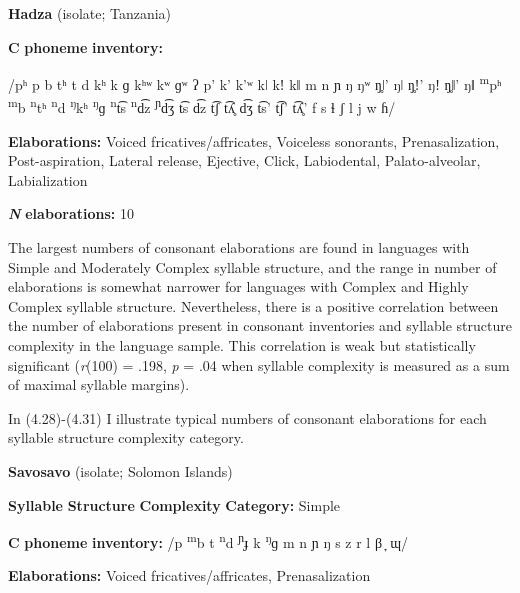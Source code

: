 \ea\label{ex:(4.27)}
  \textbf{Hadza} (isolate; Tanzania)



\textbf{C} \textbf{phoneme} \textbf{inventory:} 



/pʰ p b tʰ t d kʰ k ɡ kʰʷ kʷ ɡʷ ʔ p’ k’ k’ʷ kǀ kǃ kǁ m n ɲ ŋ ŋʷ ŋ̥ǀ’ ŋǀ ŋ̥ǃ’ ŋǃ ŋ̥ǁ’ ŋǁ \textsuperscript{m}pʰ \textsuperscript{m}b \textsuperscript{n}tʰ \textsuperscript{n}d \textsuperscript{ŋ}kʰ \textsuperscript{ŋ}ɡ \textsuperscript{n}t͡s \textsuperscript{n}d͡z \textsuperscript{ɲ}d͡ʒ t͡s d͡z t͡ʃ t͡ʎ̥ d͡ʒ t͡s’ t͡ʃ’ t͡ʎ̥’ f s ɬ ʃ l j w ɦ/



\textbf{Elaborations:} Voiced fricatives/affricates, Voiceless sonorants, Prenasalization, Post-aspiration, Lateral release, Ejective, Click, Labiodental, Palato-alveolar, Labialization



\textbf{\textit{N}} \textbf{elaborations:} 10

\z


  The largest numbers of consonant elaborations are found in languages with Simple and Moderately Complex syllable structure, and the range in number of elaborations is somewhat narrower for languages with Complex and Highly Complex syllable structure. Nevertheless, there is a positive correlation between the number of elaborations present in consonant inventories and syllable structure complexity in the language sample. This correlation is weak but statistically significant (\textit{r}(100) = .198, \textit{p} = .04 when syllable complexity is measured as a sum of maximal syllable margins).



  In (4.28)-(4.31) I illustrate typical numbers of consonant elaborations for each syllable structure complexity category.



\ea\label{ex:(4.28)}
  \textbf{Savosavo} (isolate; Solomon Islands)



\textbf{Syllable} \textbf{Structure} \textbf{Complexity} \textbf{Category:} Simple



\textbf{C} \textbf{phoneme} \textbf{inventory:} /p \textsuperscript{m}b t \textsuperscript{n}d \textsuperscript{ɲ}ɟ k \textsuperscript{ŋ}ɡ m n ɲ ŋ s z r l β ̞ ɰ/



\textbf{Elaborations:} Voiced fricatives/affricates, Prenasalization



